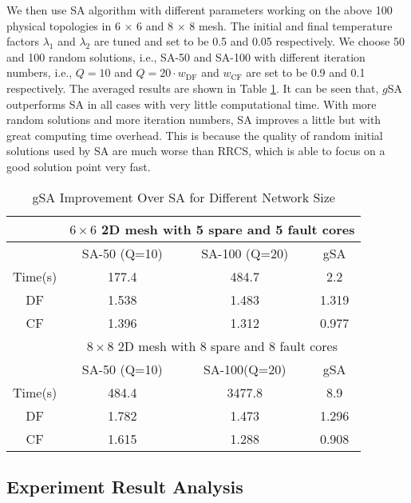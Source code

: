 We then use SA algorithm with different parameters working on the above 100 physical topologies in 6 $\times$ 6 and 8 $\times$ 8 mesh. The initial and final temperature factors  $\lambda_{1}$   and $\lambda_{2}$  are tuned and set to be 0.5 and 0.05 respectively. We choose 50 and 100 random solutions, i.e., SA-50 and SA-100 with different iteration numbers, i.e., $Q=10$ and $Q=20 \cdot w_{\mathrm{DF}} $  and $w_{\mathrm{CF}}$ are set to be 0.9 and 0.1 respectively. The averaged results are shown in Table \ref{tab:gSA-Improve}. It can be seen that, $g$SA outperforms SA in all cases with very little computational time. With more random solutions and more iteration numbers, SA improves a little but with great computing time overhead. This is because the quality of random initial solutions used by SA are much worse than RRCS, which is able to focus on a good solution point very fast.

\begin{table}
    \setlength{\tabcolsep}{4mm}
    \caption{gSA Improvement Over SA for Different Network Size}
    \centering
    \begin{tabular}{c|ccc}
        \hline
         & \multicolumn{3}{c}{$6 \times 6$ 2D mesh with 5 spare and 5 fault cores} \\ \hline
         &  SA-50 (Q=10)  &  SA-100 (Q=20)  &  gSA  \\
 Time(s) & 177.4        &  484.7         &  2.2   \\
 DF      & 1.538        &  1.483         &  1.319 \\
 CF      & 1.396        &  1.312         &  0.977 \\ \hline
         & \multicolumn{3}{c}{$8 \times 8$ 2D mesh with 8 spare and 8 fault cores } \\ \hline
         & SA-50 (Q=10) & SA-100(Q=20)   & gSA  \\
 Time(s) & 484.4        & 3477.8         & 8.9    \\
 DF      & 1.782        & 1.473          & 1.296  \\
 CF      & 1.615        & 1.288          & 0.908  \\ 
 \hline
    \end{tabular}
    \label{tab:gSA-Improve}
\end{table}

\subsection{Experiment Result Analysis}
